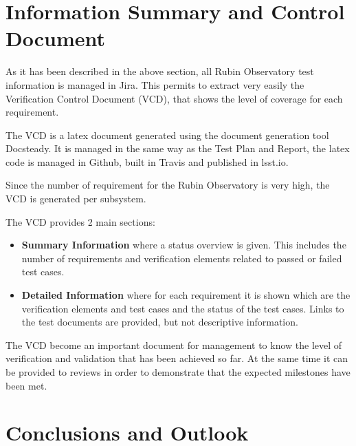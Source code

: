 \section{Information Summary and Control Document}

As it has been described in the above section, all Rubin Observatory test information is managed in Jira. 
This permits to extract very easily the Verification Control Document (VCD), that shows the level of coverage for each requirement.

The VCD is a latex document generated using the document generation tool Docsteady. 
It is managed in the same way as the Test Plan and Report, the latex code is managed in Github,
built in Travis and published in lsst.io.

Since the number of requirement for the Rubin Observatory is very high, the VCD is generated per subsystem.

The VCD provides 2 main sections:

\begin{itemize}
\item \textbf{Summary Information} where a status overview is given. 
This includes the number of requirements and verification elements related to passed or failed test cases.
\item \textbf{Detailed Information} where for each requirement it is shown which are the verification elements and test cases
and the status of the test cases. Links to the test documents are provided, but not descriptive information.
\end{itemize}

The VCD become an important document for management to know the level of verification and validation that has been achieved so far.
At the same time it can be provided to reviews in order to demonstrate that the expected milestones have been met.

\section{Conclusions and Outlook}





